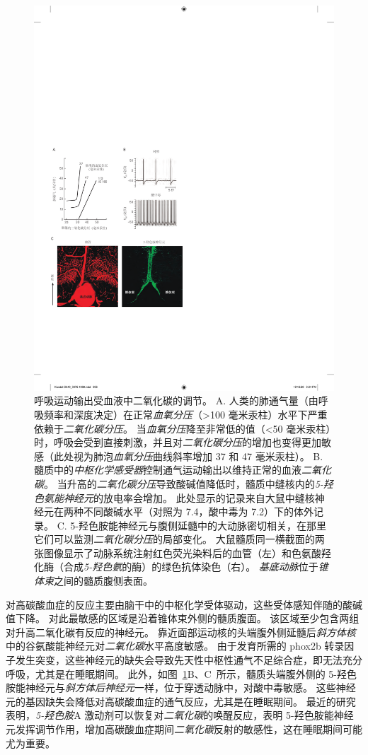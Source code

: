 \begin{figure}[htbp]
	\centering
	\includegraphics[width=0.7\linewidth]{chap40/fig_40_9}
	\caption{呼吸运动输出受血液中二氧化碳的调节。
		A. 人类的肺通气量（由呼吸频率和深度决定）在正常\textit{血氧分压}（>100 毫米汞柱）水平下严重依赖于\textit{二氧化碳分压}。
		当\textit{血氧分压}降至非常低的值（<50 毫米汞柱）时，呼吸会受到直接刺激，并且对\textit{二氧化碳分压}的增加也变得更加敏感（此处视为肺泡\textit{血氧分压}曲线斜率增加 37 和 47 毫米汞柱）。
		B. 髓质中的\textit{中枢化学感受器}控制通气运动输出以维持正常的血液\textit{二氧化碳}。
		当升高的\textit{二氧化碳分压}导致酸碱值降低时，髓质中缝核内的\textit{5-羟色氨能神经元}的放电率会增加。
		此处显示的记录来自大鼠中缝核神经元在两种不同酸碱水平（对照为 7.4，酸中毒为 7.2）下的体外记录\cite{wang2002quantification}。
		C. 5-羟色胺能神经元与腹侧延髓中的大动脉密切相关，在那里它们可以监测\textit{二氧化碳分压}的局部变化。
		大鼠髓质同一横截面的两张图像显示了动脉系统注射红色荧光染料后的血管（左）和色氨酸羟化酶（合成\textit{5-羟色氨}的酶）的绿色抗体染色（右）。
		\textit{基底动脉}位于\textit{锥体束}之间的髓质腹侧表面\cite{bradley2002chemosensitive}。}
	\label{fig:40_9}
\end{figure}


对高碳酸血症的反应主要由脑干中的中枢化学受体驱动，这些受体感知伴随的酸碱值下降。
对此最敏感的区域是沿着锥体束外侧的髓质腹面。
该区域至少包含两组对升高二氧化碳有反应的神经元。
靠近面部运动核的头端腹外侧延髓后\textit{斜方体核}中的谷氨酸能神经元对\textit{二氧化碳}水平高度敏感。
由于发育所需的 phox2b 转录因子发生突变，这些神经元的缺失会导致先天性中枢性通气不足综合症，即无法充分呼吸，尤其是在睡眠期间。
此外，如图~\ref{fig:40_9}B、C~所示，髓质头端腹外侧的 5-羟色胺能神经元与\textit{斜方体后神经元}一样，位于穿透动脉中，对酸中毒敏感。
这些神经元的基因缺失会降低对高碳酸血症的通气反应，尤其是在睡眠期间。
最近的研究表明，\textit{5-羟色胺}A 激动剂可以恢复对\textit{二氧化碳}的唤醒反应，表明 5-羟色胺能神经元发挥调节作用，增加高碳酸血症期间\textit{二氧化碳}反射的敏感性，这在睡眠期间可能尤为重要。


